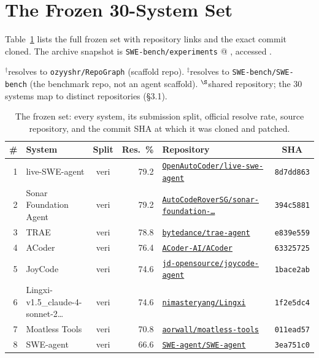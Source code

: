 \appendix
\sloppy
\clearpage
\section{The Frozen 30-System Set}
\label{app:set}
Table~\ref{tab:frozen} lists the full frozen set with repository links and the
exact commit cloned. The archive snapshot is
\texttt{SWE-bench/experiments} @ \texttt{\swArchiveSHA}, accessed \swAccessDate.

\begin{table}[H]\centering
\caption{The frozen set: every system, its submission split, official resolve
rate, source repository, and the commit SHA at which it was cloned and patched.}
\label{tab:frozen}\scriptsize
$^{\dagger}$resolves to \texttt{ozyyshr/RepoGraph} (scaffold repo). $^{\ddagger}$resolves to
\texttt{SWE-bench/SWE-bench} (the benchmark repo, not an agent scaffold). $^{\S}$shared
repository; the 30 systems map to \swDistinctRepos{} distinct repositories (\S3.1).\\[3pt]
\setlength{\tabcolsep}{3pt}
\begin{tabular}{rlcrlc}
\toprule
\# & System & Split & Res.\ \% & Repository & SHA \\
\midrule
1 & live-SWE-agent & veri & 79.2 & \href{https://github.com/OpenAutoCoder/live-swe-agent}{\texttt{OpenAutoCoder/live-swe-agent}} & \texttt{8d7dd863} \\
2 & Sonar Foundation Agent & veri & 79.2 & \href{https://github.com/AutoCodeRoverSG/sonar-foundation-agent}{\texttt{AutoCodeRoverSG/sonar-foundation-\ldots{}}} & \texttt{394c5881} \\
3 & TRAE & veri & 78.8 & \href{https://github.com/bytedance/trae-agent}{\texttt{bytedance/trae-agent}} & \texttt{e839e559} \\
4 & ACoder & veri & 76.4 & \href{https://github.com/ACoder-AI/ACoder}{\texttt{ACoder-AI/ACoder}} & \texttt{63325725} \\
5 & JoyCode & veri & 74.6 & \href{https://github.com/jd-opensource/joycode-agent}{\texttt{jd-opensource/joycode-agent}} & \texttt{1bace2ab} \\
6 & Lingxi-v1.5\_claude-4-sonnet-2\ldots{} & veri & 74.6 & \href{https://github.com/nimasteryang/Lingxi}{\texttt{nimasteryang/Lingxi}} & \texttt{1f2e5dc4} \\
7 & Moatless Tools & veri & 70.8 & \href{https://github.com/aorwall/moatless-tools}{\texttt{aorwall/moatless-tools}} & \texttt{011ead57} \\
8 & SWE-agent & veri & 66.6 & \href{https://github.com/SWE-agent/SWE-agent}{\texttt{SWE-agent/SWE-agent}} & \texttt{3ea751c0} \\

\end{tabular}
\end{table}
